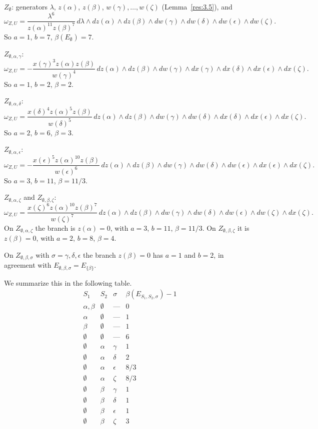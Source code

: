 \documentclass[12pt,letterpaper]{amsart}
\theoremstyle{plain}
\theoremstyle{definition}
\theoremstyle{remark}
\theoremstyle{definition}
\begin{document}
\medskip
$Z_{\emptyset}$: generators $\lambda$, $z(\alpha)$, $z(\beta)$, $w(\gamma),
\dots,w(\zeta)$ (Lemma~\ref{res:3.5}), and
\[
\omega_{Z,U}=\frac{\lambda^6}{z(\alpha)^{11}z(\beta)^7}\,
d\lambda\wedge dz(\alpha)\wedge dz(\beta)\wedge dw(\gamma)
\wedge dw(\delta)\wedge dw(\epsilon)\wedge dw(\zeta).
\]
So $a=1$, $b=7$, $\beta(E_\emptyset)=7$.

\medskip
$Z_{\emptyset,\alpha,\gamma}$:
\[
\omega_{Z,U}
=-\frac{x(\gamma)^3z(\alpha)z(\beta)}{w(\gamma)^4}\,
dz(\alpha)\wedge dz(\beta)\wedge dw(\gamma)\wedge dx(\gamma)
\wedge dx(\delta)\wedge dx(\epsilon)\wedge dx(\zeta).
\]
So $a=1$, $b=2$, $\beta=2$.

\medskip
$Z_{\emptyset,\alpha,\delta}$:
\[
\omega_{Z,U}
=\frac{x(\delta)^4z(\alpha)^5z(\beta)}{w(\delta)^5}\,
dz(\alpha)\wedge dz(\beta)\wedge dw(\gamma)\wedge dw(\delta)
\wedge dx(\delta)\wedge dx(\epsilon)\wedge dx(\zeta).
\]
So $a=2$, $b=6$, $\beta=3$.

\medskip
$Z_{\emptyset,\alpha,\epsilon}$:
\[
\omega_{Z,U}
=-\frac{x(\epsilon)^5z(\alpha)^{10}z(\beta)}{w(\epsilon)^6}\,
dz(\alpha)\wedge dz(\beta)\wedge dw(\gamma)\wedge dw(\delta)
\wedge dw(\epsilon)\wedge dx(\epsilon)\wedge dx(\zeta).
\]
So $a=3$, $b=11$, $\beta=11/3$.

\medskip
$Z_{\emptyset,\alpha,\zeta}$ and $Z_{\emptyset,\beta,\zeta}$:
\begin{equation}\tag{4.2A}\label{eq:4.2A}
\omega_{Z,U}
=\frac{x(\zeta)^6z(\alpha)^{10}z(\beta)^7}{w(\zeta)^7}\,
dz(\alpha)\wedge dz(\beta)\wedge dw(\gamma)\wedge dw(\delta)
\wedge dw(\epsilon)\wedge dw(\zeta)\wedge dx(\zeta).
\end{equation}
On $Z_{\emptyset,\alpha,\zeta}$ the branch is $z(\alpha)=0$, with $a=3$, $b=11$,
$\beta=11/3$. On $Z_{\emptyset,\beta,\zeta}$ it is $z(\beta)=0$, with $a=2$,
$b=8$, $\beta=4$.

\medskip
On $Z_{\emptyset,\beta,\sigma}$ with $\sigma=\gamma,\delta,\epsilon$ the
branch $z(\beta)=0$ has $a=1$ and $b=2$, in agreement with
$E_{\emptyset,\beta,\sigma}=E_{\{\beta\}}$.

We summarize this in the following table.
\begin{equation}\tag{4.3}\label{tab:4.3}
\begin{array}{cccc}
S_1&S_2&\sigma&\beta(E_{S_1,S_2,\sigma})-1\\[2pt]
\hline
\alpha,\beta&\emptyset&\text{---}&0\\
\alpha&\emptyset&\text{---}&1\\
\beta&\emptyset&\text{---}&1\\
\emptyset&\emptyset&\text{---}&6\\
\emptyset&\alpha&\gamma&1\\
\emptyset&\alpha&\delta&2\\
\emptyset&\alpha&\epsilon&8/3\\
\emptyset&\alpha&\zeta&8/3\\
\emptyset&\beta&\gamma&1\\
\emptyset&\beta&\delta&1\\
\emptyset&\beta&\epsilon&1\\
\emptyset&\beta&\zeta&3
\end{array}
\end{equation}
\end{document}
